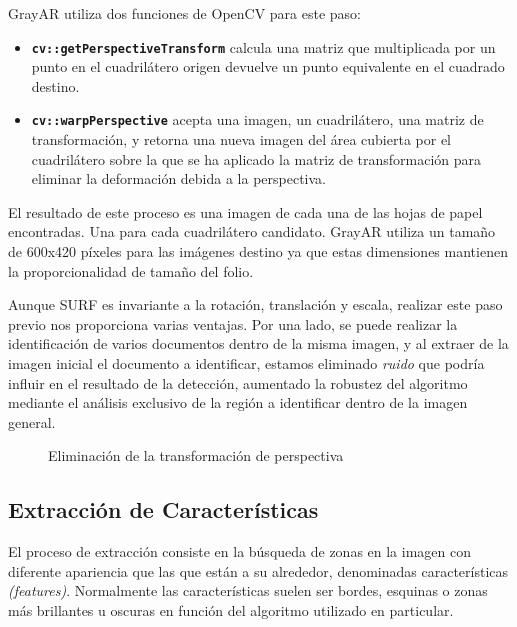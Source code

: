 GrayAR utiliza dos funciones de OpenCV para este paso:

\begin{itemize}
\item \textbf{\texttt{cv::getPerspectiveTransform}} calcula
  una matriz que multiplicada por un punto en el cuadrilátero origen
  devuelve un punto equivalente en el cuadrado destino.

\item \textbf{\texttt{cv::warpPerspective}} acepta una
  imagen, un cuadrilátero, una matriz de transformación, y retorna una
  nueva imagen del área cubierta por el cuadrilátero sobre la que se
  ha aplicado la matriz de transformación para eliminar la deformación
  debida a la perspectiva.
\end{itemize}

El resultado de este proceso es una imagen de cada una de las hojas de
papel encontradas. Una para cada cuadrilátero candidato. GrayAR utiliza
un tamaño de 600x420 píxeles para las imágenes destino ya que estas dimensiones mantienen la proporcionalidad de tamaño del folio.

Aunque SURF es invariante a la rotación, translación y
escala, realizar este paso previo nos proporciona varias ventajas. Por
una lado, se puede realizar la identificación de varios documentos
dentro de la misma imagen, y al extraer de la imagen inicial el
documento a identificar, estamos eliminado \emph{ruido} que podría
influir en el resultado de la detección, aumentado la robustez del algoritmo mediante
el análisis exclusivo de la región a identificar dentro de la imagen
general.

\begin{figure}
\centering
{}
\caption{Eliminación de la transformación de perspectiva} \label{fig:warp}
\end{figure}



\subsection{Extracción de Características}

El proceso de extracción consiste en la búsqueda de zonas en la imagen
con diferente apariencia que las que están a su alrededor, denominadas características \textit{(features)}. Normalmente las características suelen ser bordes, esquinas o zonas más brillantes u oscuras en
función del algoritmo utilizado en particular.

